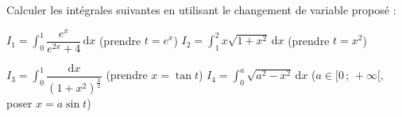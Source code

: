 
\begin{exercice}\label{exoautoanalyseCTU-23}


Calculer les intégrales suivantes en utilisant le changement de variable proposé : 


$I_{1}=\displaystyle\int_{0}^{1}\dfrac{e^x}{e^{2x}+4} \,\mathrm dx$ \quad (prendre $t = e^x$)
\hspace{2 cm}
$I_{2}=\displaystyle\int_{1}^{2}x\sqrt{1+x^2} \,\mathrm dx$  \quad (prendre $t = x^2$)


$I_{3}=\displaystyle\int_{0}^{1}\dfrac{\mathrm dx}{(1+x^2)^{\frac{3}{2}}}$ \quad (prendre $x=\tan t$)
\hfill
$I_{4}=\displaystyle\int_{0}^{a}\sqrt{a^2-x^2} \,\mathrm dx$ \quad ($a \in [0\,;\,+\infty[$, poser $x=a\sin t$)






\end{exercice}
